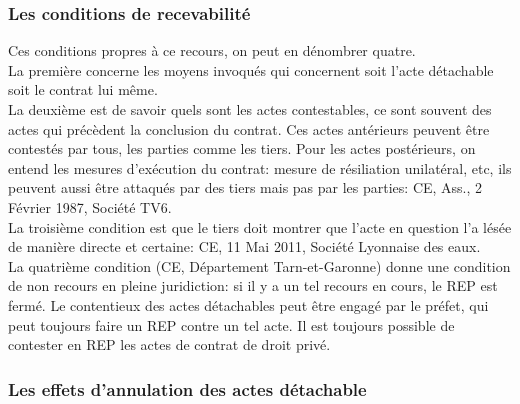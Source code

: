 \documentclass[10pt, a4paper, openany]{book}
\begin{document}
\subsubsection{Les conditions de recevabilité}

Ces conditions propres à ce recours, on peut en dénombrer quatre. \\
La première concerne les moyens invoqués qui concernent soit l'acte détachable soit le contrat lui même. \\
La deuxième est de savoir quels sont les actes contestables, ce sont souvent des actes qui précèdent la conclusion du contrat. Ces actes antérieurs peuvent être contestés par tous, les parties comme les tiers. Pour les actes postérieurs, on entend les mesures d'exécution du contrat: mesure de résiliation unilatéral, etc, ils peuvent aussi être attaqués par des tiers mais pas par les parties: CE, Ass., 2 Février 1987, Société TV6. \\
La troisième condition est que le tiers doit montrer que l'acte en question l'a lésée de manière directe et certaine: CE, 11 Mai 2011, Société Lyonnaise des eaux. \\
La quatrième condition (CE, Département Tarn-et-Garonne) donne une condition de non recours en pleine juridiction: si il y a un tel recours en cours, le REP est fermé. Le contentieux des actes détachables peut être engagé par le préfet, qui peut toujours faire un REP contre un tel acte. Il est toujours possible de contester en REP les actes de contrat de droit privé. 

\subsubsection{Les effets d'annulation des actes détachable}
\end{document}

